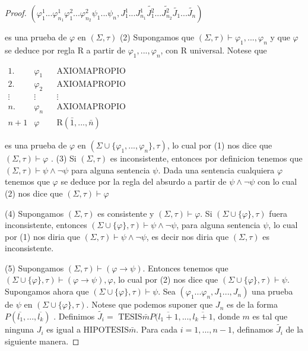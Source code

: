 \begin{proof}
    \(\displaystyle (\varphi _{1}^{1}...\varphi _{n_{1}}^{1}\varphi _{1}^{2}...\varphi _{n_{2}}^{2}\psi _{1}...\psi _{n},J_{1}^{1}...J_{n_{1}}^{1}\widetilde{ J_{1}^{2}}...\widetilde{J_{n_{2}}^{2}}\widetilde{J_{1}}...\widetilde{J_{n}}) \)

    es una prueba de \(\varphi \) en \((\Sigma ,\tau )\)
    (2) Supongamos que \((\Sigma ,\tau )\vdash \varphi _{1},...,\varphi _{n}\) y que \(\varphi \) se deduce por regla R a partir de \(\varphi _{1},...,\varphi _{n}\), con R universal. Notese que

    \(\displaystyle \begin{array}{llll} 1.\; & \varphi _{1} & & \text{AXIOMAPROPIO} \\ 2.\; & \varphi _{2} & & \text{AXIOMAPROPIO} \\ \vdots & \vdots & & \vdots \\ n. & \varphi _{n} & & \text{AXIOMAPROPIO} \\ n+1 & \varphi & & \text{R}(\bar{1},...,\bar{n}) \end{array} \)

    es una prueba de \(\varphi \) en \((\Sigma \cup \{\varphi _{1},...,\varphi _{n}\},\tau )\), lo cual por (1) nos dice que \((\Sigma ,\tau )\vdash \varphi \) .
    (3) Si \((\Sigma ,\tau )\) es inconsistente, entonces por definicion tenemos que \((\Sigma ,\tau )\vdash \psi \wedge \lnot \psi \) para alguna sentencia \( \psi \). Dada una sentencia cualquiera \(\varphi \) tenemos que \(\varphi \) se deduce por la regla del absurdo a partir de \(\psi \wedge \lnot \psi \) con lo cual (2) nos dice que \((\Sigma ,\tau )\vdash \varphi \)

    (4) Supongamos \((\Sigma ,\tau )\) es consistente y \((\Sigma ,\tau )\vdash \varphi \). Si \((\Sigma \cup \{\varphi \},\tau )\) fuera inconsistente, entonces \((\Sigma \cup \{\varphi \},\tau )\vdash \psi \wedge \lnot \psi \), para alguna sentencia \(\psi \), lo cual por (1) nos diria que \((\Sigma ,\tau )\vdash \psi \wedge \lnot \psi \), es decir nos diria que \((\Sigma ,\tau )\) es inconsistente.

    (5) Supongamos \((\Sigma ,\tau )\vdash (\varphi \rightarrow \psi )\). Entonces tenemos que \((\Sigma \cup \{\varphi \},\tau )\vdash (\varphi \rightarrow \psi ),\varphi \), lo cual por (2) nos dice que \((\Sigma \cup \{\varphi \},\tau )\vdash \psi \). Supongamos ahora que \((\Sigma \cup \{\varphi \},\tau )\vdash \psi \). Sea \((\varphi _{1}...\varphi _{n},J_{1}...,J_{n})\) una prueba de \(\psi \) en \((\Sigma \cup \{\varphi \},\tau )\). Notese que podemos suponer que \(J_{n}\) es de la forma \(P(\overline{l_{1}},...,\overline{l_{k}})\) . Definimos \(\widetilde{J_{i}}=\) \(\mathrm{TESIS}\bar{m}P(\overline{l_{1}+1} ,...,\overline{l_{k}+1}\), donde \(m\) es tal que ninguna \(J_{i}\) es igual a \( \mathrm{HIPOTESIS}\bar{m}\). Para cada \(i=1,...,n-1\), definamos \(\widetilde{ J_{i}}\) de la siguiente manera.


\end{proof}
